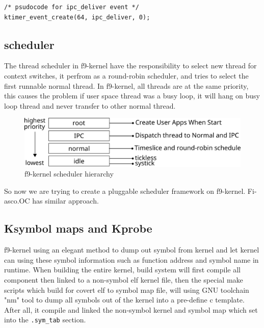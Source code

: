 \documentclass[10pt,preprint,nocopyrightspace]{sigplanconf}
\begin{document}
\begin{lstlisting}[basicstyle=\small,frame=single]
/* psudocode for ipc_deliver event */
ktimer_event_create(64, ipc_deliver, 0);
\end{lstlisting}

\subsection{scheduler}

The thread scheduler in f9-kernel have the responsibility to select new thread for context switches, it perfrom as a round-robin scheduler, and tries to select the first runnable normal thread. In f9-kernel, all threads are at the same priority, this causes the problem if user space thread was a busy loop, it will hang on busy loop thread and never transfer to other normal thread.

\begin{figure}[H]
	\begin{center}
		\includegraphics[width=\linewidth]{picture/scheduler.png}
	\end{center}
	\caption{f9-kernel scheduler hierarchy}
\end{figure}

So now we are trying to create a pluggable scheduler framework on f9-kernel.  Fi-asco.OC has similar approach\cite{elphinstone2013l3,fiasco}.

\subsection{Ksymbol maps and Kprobe}
f9-kernel using an elegant method to dump out symbol from kernel and let kernel can using these symbol information such as function address and symbol name in runtime. When building the entire kernel, build system will first compile all component then linked to a non-symbol elf kernel file, then the special make scripts which build for covert elf to symbol map file, will using GNU toolchain "nm" tool to dump all symbols out of the kernel into a pre-define c template. After all, it compile and linked the non-symbol kernel and symbol map which set into the \texttt{.sym\_tab} section.
\end{document}
